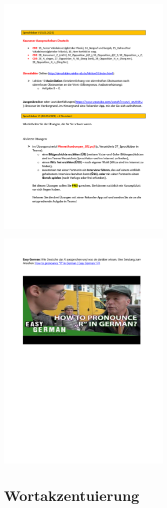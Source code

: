 \documentclass[
  letterpaper,
]{scrbook}
\begin{document}
\includegraphics[width=3.31in,height=\textheight]{./pictures/sprachlabor/Sprachlaboruebungen_2022_Page3.png}

\includegraphics[width=3.31in,height=\textheight]{./pictures/sprachlabor/Sprachlaboruebungen_2022_Page4.png}

\hypertarget{sec-wortakzent}{%
\chapter{Wortakzentuierung}\label{sec-wortakzent}}
\end{document}
